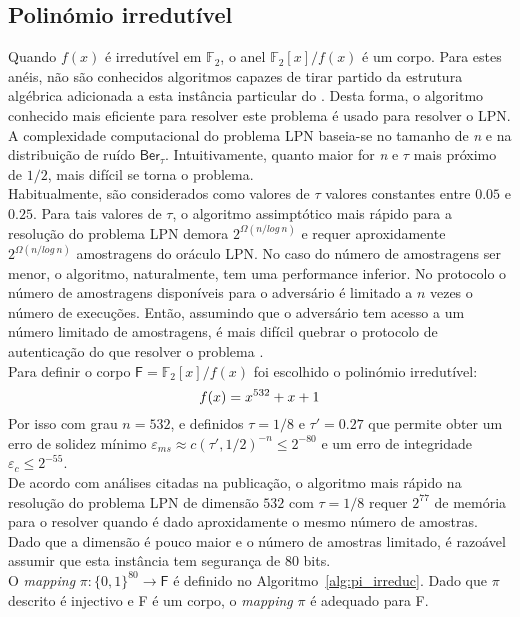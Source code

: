 \subsection{Polinómio irredutível}
Quando $f(x)$ é irredutível em $\mathbb{F}_2$, o anel $\mathbb{F}_2[x]/f(x)$ é um corpo. Para estes anéis, não são conhecidos algoritmos capazes de tirar partido da estrutura algébrica adicionada a esta instância particular do \RingLPN. Desta forma, o algoritmo conhecido mais eficiente para resolver este problema é usado para resolver o \textsf{LPN}.\\
A complexidade computacional do problema \textsf{LPN} baseia-se no tamanho de \textit{n} e na distribuição de ruído $\mathsf{Ber_\tau}$. Intuitivamente, quanto maior for \textit{n} e $\tau$ mais próximo de $1/2$, mais difícil se torna o problema.\\
Habitualmente, são considerados como valores de $\tau$ valores constantes entre $0.05$ e $0.25$. Para tais valores de $\tau$, o algoritmo assimptótico mais rápido para a resolução do problema \textsf{LPN} demora $2^{\Omega(n/log\ n)}$ e requer aproxidamente $2^{\Omega(n/log\ n)}$ amostragens do oráculo \textsf{LPN}. No caso do número de amostragens ser menor, o algoritmo, naturalmente, tem uma performance inferior. No protocolo o número de amostragens disponíveis para o adversário é limitado a $n$ vezes o número de execuções. Então, assumindo que o adversário tem acesso a um número limitado de amostragens, é mais difícil quebrar o protocolo de autenticação do que resolver o problema \RingLPN.\\
Para definir o corpo $\mathsf{F} = \mathbb{F}_2[x]/f(x)$ foi escolhido o polinómio irredutível:
$$
  f(x)  =  x^{532} + x + 1 \\
$$
Por isso com grau $n = 532$, e definidos $\tau = 1/8$ e $\tau' = 0.27$ que permite obter um erro de solidez mínimo $\varepsilon_{ms} \approx c(\tau', 1/2)^{-n} \le 2^{-80}$ e um erro de integridade $\varepsilon_{c} \le 2^{-55}$.\\
De acordo com análises citadas na publicação, o algoritmo mais rápido na resolução do problema \textsf{LPN} de dimensão $532$ com $\tau = 1/8$ requer $2^{77}$ de memória para o resolver quando é dado aproxidamente o mesmo número de amostras. Dado que a dimensão é pouco maior e o número de amostras limitado, é razoável assumir que esta instância tem segurança de $80$ bits.\\
O \textit{mapping} $\pi : \{0,1\}^{80} \rightarrow \mathsf{F}$ é definido no Algoritmo~\ref{alg:pi_irreduc}. Dado que $\pi$ descrito é injectivo e \textsf{F} é um corpo, o \textit{mapping} $\pi$ é adequado para \textsf{F}.

